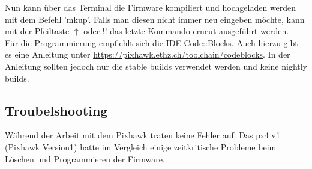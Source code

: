 \noindent
Nun kann über das Terminal die Firmware kompiliert und hochgeladen werden mit dem Befehl 'mkup'. Falls man diesen nicht immer neu eingeben möchte, kann mit der Pfeiltaste $\uparrow$  oder !! das letzte Kommando erneut ausgeführt werden.\\

\noindent
Für die Programmierung empfiehlt sich die IDE Code::Blocks. Auch hierzu gibt es eine Anleitung unter \href{https://pixhawk.ethz.ch/toolchain/codeblocks}{https://pixhawk.ethz.ch/toolchain/codeblocks}. In der Anleitung sollten jedoch nur die stable builds verwendet werden und keine nightly builds.


\subsection{Troubelshooting}
Während der Arbeit mit dem Pixhawk traten keine Fehler auf. Das px4 v1 (Pixhawk Version1) hatte im Vergleich einige zeitkritische Probleme beim Löschen und Programmieren der Firmware. 
\clearpage
